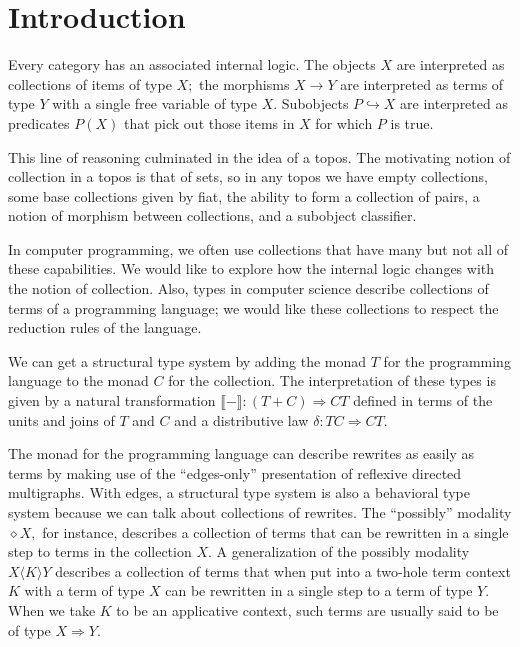 \documentclass[sigplan,9pt,review,anonymous]{acmart}\settopmatter{printfolios=true,printccs=false,printacmref=false}
\newcommand{\maps}{\colon}
\newcommand{\into}{\hookrightarrow}
\newcommand{\interp}[1]{\llbracket #1 \rrbracket}
\begin{document}
\maketitle


\section{Introduction}
Every category has an associated internal logic.  The objects $X$ are interpreted as collections of items of type $X;$ the morphisms $X \to Y$ are interpreted as terms of type $Y$ with a single free variable of type $X.$  Subobjects $P \into X$ are interpreted as predicates $P(X)$ that pick out those items in $X$ for which $P$ is true.

This line of reasoning culminated in the idea of a topos.  The motivating notion of collection in a topos is that of sets, so in any topos we have empty collections, some base collections given by fiat, the ability to form a collection of pairs, a notion of morphism between collections, and a subobject classifier.

In computer programming, we often use collections that have many but not all of these capabilities.  We would like to explore how the internal logic changes with the notion of collection.  Also, types in computer science describe collections of terms of a programming language; we would like these collections to respect the reduction rules of the language.

We can get a structural type system by adding the monad $T$ for the programming language to the monad $C$ for the collection.  The interpretation of these types is given by a natural transformation ${\interp{-}\maps (T+C) \Rightarrow CT}$ defined in terms of the units and joins of $T$ and $C$ and a distributive law ${\delta\maps TC \Rightarrow CT}.$

The monad for the programming language can describe rewrites as easily as terms by making use of the ``edges-only'' presentation of reflexive directed multigraphs.  With edges, a structural type system is also a behavioral type system because we can talk about collections of rewrites.  The ``possibly'' modality $\diamond X,$ for instance, describes a collection of terms that can be rewritten in a single step to terms in the collection $X.$  A generalization of the possibly modality $X\langle K\rangle Y$ describes a collection of terms that when put into a two-hole term context $K$ with a term of type $X$ can be rewritten in a single step to a term of type $Y.$  When we take $K$ to be an applicative context, such terms are usually said to be of type $X \Rightarrow Y.$
\end{document}
